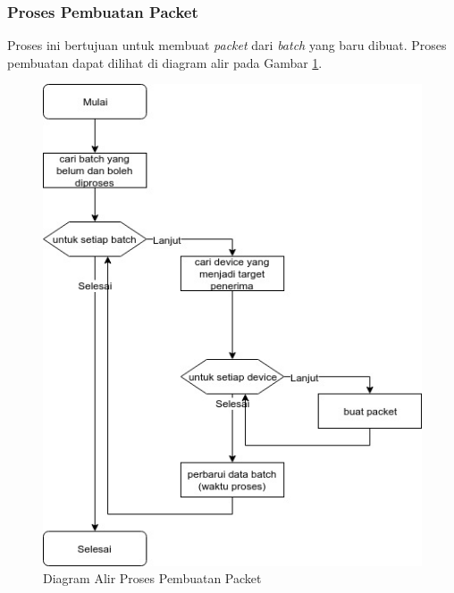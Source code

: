 \subsubsection{Proses Pembuatan Packet}
\par Proses ini bertujuan untuk membuat \textit{packet} dari \textit{batch} yang baru dibuat. Proses pembuatan dapat dilihat di diagram alir pada Gambar \ref{flowchart_pembuatan_packet}.
\begin{figure}[hb]
	\caption{Diagram Alir Proses Pembuatan Packet} \label{flowchart_pembuatan_packet}
    \centering\includegraphics[width=1\textwidth]{bab3/figures/flowchart_pembuatan_packet.jpg}
\end{figure}

